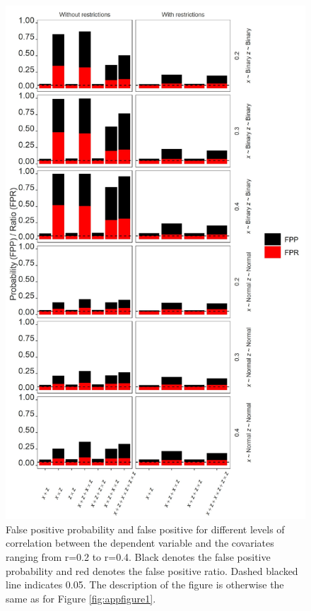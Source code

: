 \begin{figure}[hbt!]
\includegraphics[scale=0.7]{R/Analysis/Result/Figures/Figure2SI.jpeg}
\centering
\caption{False positive probability and false positive for different levels of correlation between the dependent variable and the covariates ranging from r=0.2 to r=0.4. Black denotes the false positive probability and red denotes the false positive ratio. Dashed blacked line indicates 0.05. The description of the figure is otherwise the same as for Figure \ref{fig:appfigure1}.}
\label{fig:appfigure2}
\end{figure}


